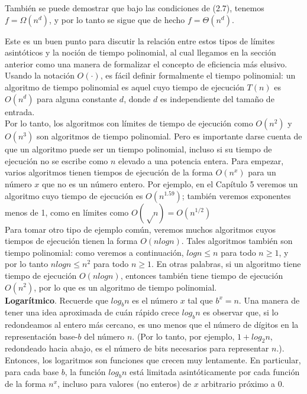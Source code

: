 \documentclass[a4paper]{article}
\begin{document}
También se puede demostrar que bajo las condiciones de (2.7), tenemos $f = \Omega(n ^ d)$, y por lo tanto se sigue que de hecho $f = \Theta(n^d)$.

Este es un buen punto para discutir la relación entre estos tipos de límites asintóticos y la noción de tiempo polinomial, al cual llegamos en la sección anterior como una manera de formalizar el concepto de eficiencia más elusivo. Usando la notación $O(·)$, es fácil definir formalmente el tiempo polinomial: un algoritmo de tiempo polinomial es aquel cuyo tiempo de ejecución $T(n)$ es $O(n^d)$ para alguna constante $d$, donde $d$ es independiente del tamaño de entrada.\\

Por lo tanto, los algoritmos con límites de tiempo de ejecución como $O(n^2)$ y $O(n^3)$ son algoritmos de tiempo polinomial. Pero es importante darse cuenta de que un algoritmo puede ser un tiempo polinomial, incluso si su tiempo de ejecución no se escribe como $n$ elevado a una potencia entera. Para empezar, varios algoritmos tienen tiempos de ejecución de la forma $O(n^x)$ para un número $x$ que no es un número entero. Por ejemplo, en el Capítulo 5 veremos un algoritmo cuyo tiempo de ejecución es $O(n^{1.59})$; también veremos exponentes menos de 1, como en límites como $O(√n) = O (n^{1/2})$\\

Para tomar otro tipo de ejemplo común, veremos muchos algoritmos cuyos tiempos de ejecución tienen la forma $O(nlogn)$. Tales algoritmos también son tiempo polinomial: como veremos a continuación, $log n ≤ n$ para todo $n ≥ 1$, y por lo tanto $n log n ≤ n^2$ para todo $n ≥ 1$. En otras palabras, si un algoritmo tiene tiempo de ejecución $O (n log n)$, entonces también tiene tiempo de ejecución $O (n^2)$, por lo que es un algoritmo de tiempo polinomial.\\

\textbf{Logarítmico}. Recuerde que $log_bn$ es el número $x$ tal que $b^x = n$. Una manera de tener una idea aproximada de cuán rápido crece $log_bn$ es observar que, si lo redondeamos al entero más cercano, es uno menos que el número de dígitos en la representación base-$b$ del número $n$. (Por lo tanto, por ejemplo, $1+ log_2 n$, redondeado hacia abajo, es el número de bits necesarios para representar $n$.).\\

Entonces, los logaritmos son funciones que crecen muy lentamente. En particular, para cada base $b$, la función $log_b n$ está limitada asintóticamente por cada función de la forma $n^x$, incluso para valores (no enteros) de $x$ arbitrario próximo a $0$.\\
\end{document}
